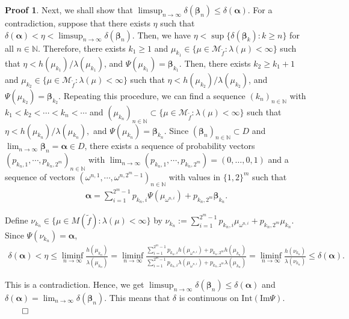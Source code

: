 \documentclass{article}
\theoremstyle{definition}
\newtheorem*{pf}{Proof}
\begin{document}
\begin{pf}
Next, we shall show that $\limsup_{n\to\infty}\delta(\boldsymbol{\beta}_n)\leq\delta(\boldsymbol{\alpha})$. For a contradiction, suppose that there exists $\eta$ such that $\delta(\boldsymbol{\alpha})<\eta<\limsup_{n\to\infty}\delta(\boldsymbol{\beta}_n)$.
Then, we have $\eta<\sup\lbrace\delta(\boldsymbol{\beta}_k):k\geq n \rbrace$ for all $n\in\mathbb{N}$. Therefore, there exists $k_1\geq1$ and $\mu_{k_1}\in\lbrace \mu \in \mathcal{M}_{\tilde f}: \lambda(\mu)<\infty \rbrace$ such that $\eta<h(\mu_{k_1})/\lambda(\mu_{k_1})$, and $\Psi(\mu_{k_1})=\boldsymbol{\beta}_{k_1}$. Then, there exists $k_2\geq k_1+1$ and $\mu_{k_2}\in\lbrace \mu \in \mathcal{M}_{\tilde f}: \lambda(\mu)<\infty \rbrace$ such that $\eta<h(\mu_{k_2})/\lambda(\mu_{k_2})$, and$\Psi(\mu_{k_2})=\boldsymbol{\beta}_{k_2}$. Repeating this procedure, we can find a sequence $(k_n)_{n\in\mathbb{N}}$ with $k_1<k_2<\cdots<k_n<\cdots$
and $(\mu_{k_n})_{n\in\mathbb{N}}\subset \lbrace \mu \in \mathcal{M}_{\tilde f}: \lambda(\mu)<\infty \rbrace$ such that
$\eta<{h(\mu_{k_n})}/{\lambda(\mu_{k_n})},$ and
$\Psi(\mu_{k_n})=\boldsymbol{\beta}_{k_n}.\nonumber$
 Since $(\boldsymbol{\beta}_n)_{n\in\mathbb{N}}\subset D$ and $\lim_{n\to\infty}\boldsymbol{\beta}_n=\boldsymbol{\alpha}\in D$,  there exists a sequence of probability vectors $(p_{k_n,1},\cdots,p_{k_n,2^m})_{n\in \mathbb{N}}$ with $\lim_{n\to\infty} (p_{k_n,1},\cdots,p_{k_n,2^m})= (0,\dots ,0,1)$ and a sequence of vectors  $(\omega^{n,1},\cdots,\omega^{n,2^m-1})_{n\in \mathbb{N}}$ with values in $\lbrace1,2\rbrace^m$ such that
 \begin{align*}
     \boldsymbol{\alpha}=\sum_{i=1}^{2^m-1}p_{k_n,i}\Psi(\mu_{\omega^{n,i}})+p_{k_n,2^m}\boldsymbol{\beta}_{k_n}.
 \end{align*}

Define  $\nu_{k_n}\in\lbrace \mu \in {M}({\tilde f}): \lambda(\mu)<\infty \rbrace$ by $\nu_{k_n}:=\sum_{i=1}^{2^m-1}p_{k_n,i}\mu_{\omega^{n,i}}+p_{k_n,2^m}\mu_{k_n}$. Since $\Psi(\nu_{k_n})=\boldsymbol{\alpha}$,
\begin{align}
    \delta(\boldsymbol{\alpha})<\eta\leq \liminf_{n\to\infty}\frac{h(\mu_{k_n})}{\lambda(\mu_{k_n})}
    =\liminf_{n\to\infty}\frac{\sum_{i=1}^{2^m-1}p_{k_n,i}h(\mu_{\omega^{n,i}})+p_{k_n,2^m}h(\mu_{k_n})}{\sum_{i=1}^{2^m-1}p_{k_n,i}\lambda(\mu_{\omega^{n,i}})+p_{k_n,2^m}\lambda(\mu_{k_n})}\nonumber
    =\liminf_{n\to\infty}\frac{h(\nu_{k_n})}{\lambda(\nu_{k_n})}\leq\delta(\boldsymbol{\alpha}).\nonumber
\end{align}

This is a contradiction. Hence, we get $\limsup_{n\to\infty}\delta(\boldsymbol{\beta}_n)\leq\delta(\boldsymbol{\alpha})$ and $\delta(\boldsymbol{\alpha})=\lim_{n\to\infty}\delta(\boldsymbol{\beta}_n)$. This means that $\delta$ is continuous on $\text{Int}(\text{Im}\Psi)$.
$\qed$  
\end{pf}
\end{document}
